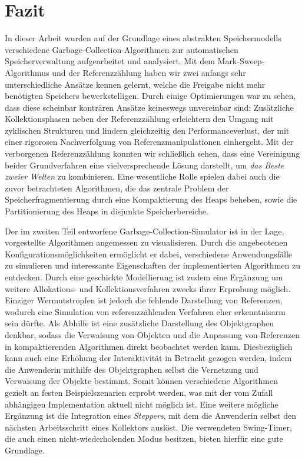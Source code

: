 \chapter{Fazit}
\label{cha:fazit}

In dieser Arbeit wurden auf der Grundlage eines abstrakten Speichermodells verschiedene Garbage-Collection-Algorithmen zur automatischen Speicherverwaltung aufgearbeitet und analysiert.
Mit dem Mark-Sweep-Algorithmus und der Referenzzählung haben wir zwei anfangs sehr unterschiedliche Ansätze kennen gelernt, welche die Freigabe nicht mehr benötigten Speichers bewerkstelligen.
Durch einige Optimierungen war zu sehen, dass diese scheinbar konträren Ansätze keineswegs unvereinbar sind:
Zusätzliche Kollektionsphasen neben der Referenzzählung erleichtern den Umgang mit zyklischen Strukturen und lindern gleichzeitig den Performanceverlust, der mit einer rigorosen Nachverfolgung von Referenzmanipulationen einhergeht.
Mit der verborgenen Referenzzählung konnten wir schließlich sehen, dass eine Vereinigung beider Grundverfahren eine vielversprechende Lösung darstellt, um \textit{das Beste zweier Welten} zu kombinieren.
Eine wesentliche Rolle spielen dabei auch die zuvor betrachteten Algorithmen, die das zentrale Problem der Speicherfragmentierung durch eine Kompaktierung des Heaps beheben, sowie die Partitionierung des Heaps in disjunkte Speicherbereiche.

Der im zweiten Teil entworfene Garbage-Collection-Simulator ist in der Lage, vorgestellte Algorithmen angemessen zu visualisieren.
Durch die angebeotenen Konfigurationsmöglichkeiten ermöglicht er dabei, verschiedene Anwendungsfälle zu simulieren und interessante Eigenschaften der implementierten Algorithmen zu entdecken.
Durch eine geschickte Modellierung ist zudem eine Ergänzung um weitere Allokations- und Kollektionsverfahren zwecks ihrer Erprobung möglich.
Einziger Wermutstropfen ist jedoch die fehlende Darstellung von Referenzen, wodurch eine Simulation von referenzzählenden Verfahren eher erkenntnisarm sein dürfte.
Als Abhilfe ist eine zusätzliche Darstellung des Objektgraphen denkbar, sodass die Verwaisung von Objekten und die Anpassung von Referenzen in kompaktierenden Algorithmen direkt beobachtet werden kann.
Diesbezüglich kann auch eine Erhöhung der Interaktivität in Betracht gezogen werden, indem die Anwenderin mithilfe des Objektgraphen selbst die Vernetzung und Verwaisung der Objekte bestimmt.
Somit können verschiedene Algorithmen gezielt an festen Beispielszenarien erprobt werden, was mit der vom Zufall abhängigen Implementation aktuell nicht möglich ist.
Eine weitere mögliche Ergänzung ist die Integration eines \textit{Steppers}, mit dem die Anwenderin selbst den nächsten Arbeitsschritt eines Kollektors auslöst.
Die verwendeten Swing-Timer, die auch einen nicht-wiederholenden Modus besitzen, bieten hierfür eine gute Grundlage.

